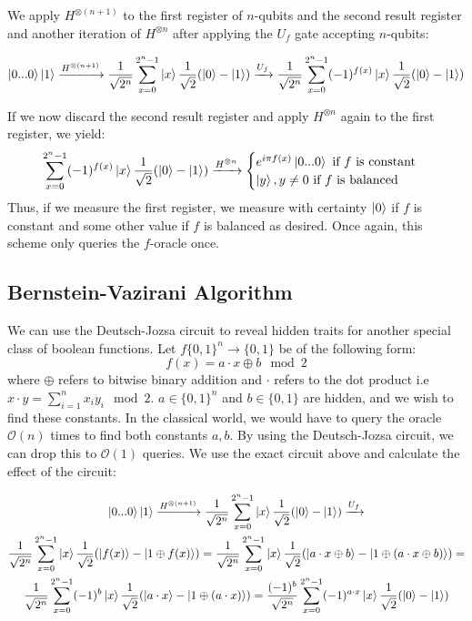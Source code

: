 \documentclass{../quantum.tex}
\begin{document}
We apply $H^{\otimes (n+1)}$ to the first register of $n$-qubits and the second result register and another iteration of $H^{\otimes n}$ after applying the $U_f$ gate accepting $n$-qubits:

\begin{gather}
\ket{0...0}\ket{1} \xrightarrow{H^{\otimes (n+1)}} \frac{1}{\sqrt{2^n}} \sum_{x = 0}^{2^n -1} \ket{x}\frac{1}{\sqrt{2}}(\ket{0}-\ket{1}) \xrightarrow{U_f} \frac{1}{\sqrt{2^n}} \sum_{x = 0}^{2^n -1} (-1)^{f(x)}\ket{x}\frac{1}{\sqrt{2}}(\ket{0}-\ket{1})
\end{gather}

If we now discard the second result register and apply $H^{\otimes n}$ again to the first register, we yield:
$$\sum_{x = 0}^{2^n -1} (-1)^{f(x)}\ket{x}\frac{1}{\sqrt{2}}(\ket{0}-\ket{1}) \xrightarrow{H^{\otimes n}} \begin{cases} e^{i\pi
f(x)}\ket{0...0} \text{ if $f$ is constant} \\
\ket{y}, y \neq 0 \text{ if $f$ is balanced}
\end{cases}$$
Thus, if we measure the first register, we measure with certainty $\ket{0}$ if $f$ is constant and some other value if $f$ is balanced as desired. Once again, this scheme only queries the $f$-oracle once.

\subsection{Bernstein-Vazirani Algorithm}
We can use the Deutsch-Jozsa circuit to reveal hidden traits for another special class of boolean functions. Let $f\{0,1\}^n \rightarrow \{0,1\}$ be of the following form:
$$f(x) = a\cdot x \oplus b \mod 2$$ where $\oplus$ refers to bitwise binary addition and $\cdot$ refers to the dot product i.e $x \cdot y = \sum_{i=1}^n x_iy_i \mod 2$. $a \in \{0,1\}^n$ and $b \in \{0,1\}$ are hidden, and we wish to find these constants. In the classical world, we would have to query the oracle $\mathcal{O}(n)$ times to find both constants $a,b$. By using the Deutsch-Jozsa circuit, we can drop this to $\mathcal{O}(1)$ queries. We use the exact circuit above and calculate the effect of the circuit:

\begin{gather}
  \ket{0...0}\ket{1}\xrightarrow{H^{\otimes (n+1)}} \frac{1}{\sqrt{2^n}} \sum_{x=0}^{2^n-1}\ket{x}\frac{1}{\sqrt{2}}(\ket{0} - \ket{1}) \xrightarrow{U_f} \\
  \frac{1}{\sqrt{2^n}} \sum_{x=0}^{2^n-1}\ket{x}\frac{1}{\sqrt{2}}(\ket{f(x)} - \ket{1\oplus f(x)}) = \frac{1}{\sqrt{2^n}} \sum_{x=0}^{2^n-1}\ket{x}\frac{1}{\sqrt{2}}(\ket{a\cdot x \oplus b} - \ket{1 \oplus (a \cdot x \oplus b)}) = \\
  \frac{1}{\sqrt{2^n}} \sum_{x=0}^{2^n-1}(-1)^b \ket{x}\frac{1}{\sqrt{2}}(\ket{a\cdot x} - \ket{1 \oplus (a \cdot x)}) = \frac{(-1)^b}{\sqrt{2^n}} \sum_{x=0}^{2^n-1}(-1)^{a\cdot x}\ket{x}\frac{1}{\sqrt{2}}(\ket{0} - \ket{1})
\end{gather}
\end{document}
